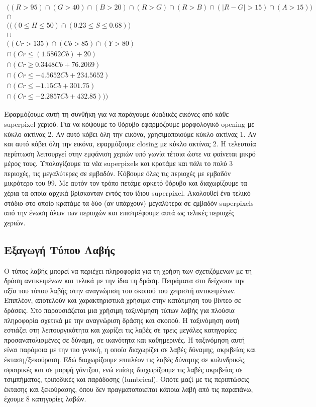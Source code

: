 \documentclass[11pt,a4paper,english,greek,twoside]{../Thesis}
\begin{document}
\begin{equation}\label{eq:ColorSpace}
\begin{gathered}
    \big( (R>95) \cap (G>40) \cap (B>20) \cap (R>G) \cap (R>B) \cap (| R-G |>15) \cap (A>15) \big) \\ \cap \\ \bigg( \big( (0\leq H\leq 50) \cap (0.23\leq S\leq 0.68) \big) \\ \cup \\ \big( (Cr>135) \cap (Cb>85) \cap (Y>80) \\ \cap (Cr\leq (1.5862Cb)+20) \\ \cap (Cr\geq 0.3448Cb+76.2069) \\ \cap (Cr\leq -4.5652Cb+234.5652) \\ \cap (Cr\leq -1.15Cb+301.75) \\ \cap (Cr\leq -2.2857Cb+432.85) \big) \bigg)
\end{gathered}
\end{equation}

\par Εφαρμόζουμε αυτή τη συνθήκη για να παράγουμε δυαδικές εικόνες από κάθε superpixel χεριού. Για να κόψουμε το θόρυβο εφαρμόζουμε μορφολογικό opening με κύκλο ακτίνας 2. Αν αυτό κόβει όλη την εικόνα, χρησιμοποιούμε κύκλο ακτίνας 1. Αν και αυτό κόβει όλη την εικόνα, εφαρμόζουμε closing με κύκλο ακτίνας 2. Η τελευταία περίπτωση λειτουργεί στην εμφάνιση χεριών υπό γωνία τέτοια ώστε να φαίνεται μικρό μέρος τους. Υπολογίζουμε τα νέα superpixels και κρατάμε και πάλι το πολύ 3 περιοχές, τις μεγαλύτερες σε εμβαδόν. Κόβουμε όλες τις περιοχές με εμβαδόν μικρότερο του 99. Με αυτόν τον τρόπο πετάμε αρκετό θόρυβο και διαχωρίζουμε τα χέρια τα οποία αρχικά βρίσκονταν εντός του ίδιου superpixel. Ακολουθεί ένα τελικό στάδιο στο οποίο κρατάμε τα δύο (αν υπάρχουν) μεγαλύτερα σε εμβαδόν superpixels από την ένωση όλων των περιοχών και επιστρέφουμε αυτά ως τελικές περιοχές χεριών.

\subsection{Εξαγωγή Τύπου Λαβής}
Ο τύπος λαβής μπορεί να περιέχει πληροφορία για τη χρήση των σχετιζόμενων με τη δράση αντικειμένων και τελικά με την ίδια τη δράση. Πειράματα στο \cite{zhang_2015} δείχνουν την αξία του τύπου λαβής στην αναγνώριση του σκοπού του χειριστή αντικειμένων. Επιπλέον, αποτελούν και χαρακτηριστικά χρήσιμα στην κατάτμηση του βίντεο σε δράσεις. Στο \cite{yang_2015_grasp} παρουσιάζεται μια χρήσιμη ταξινόμηση τύπων λαβής για πλούσια πληροφορία σχετικά με την αναγνώριση δράσης και σκοπού. Η ταξινόμηση αυτή εστιάζει στη λειτουργικότητα και χωρίζει τις  λαβές σε τρεις μεγάλες κατηγορίες: προσανατολισμένες σε δύναμη, σε ικανότητα και καθημερινές. Η ταξινόμηση αυτή είναι παρόμοια με την πιο γενική, η οποία διαχωρίζει σε λαβές δύναμης, ακριβείας και έκταση/ξεκούραση. Εδώ διαχωρίζουμε επιπλέον τις λαβές δύναμης σε κυλινδρικές, σφαιρικές και σε μορφή γάντζου, ενώ επίσης διαχωρίζουμε τις λαβές ακριβείας σε τσιμπήματος, τριποδικές και παράδοσης (lumbrical). Οπότε μαζί με τις περιπτώσεις έκτασης και ξεκούρασης, όπου δεν πραγματοποιείται κάποια λαβή από τις παραπάνω, έχουμε 8 κατηγορίες λαβών.
\end{document}
